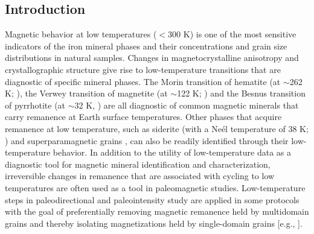\documentclass[draft,gc]{AGUTeX}
\begin{document}
%
%

%

\begin{article}

%
%

\section{Introduction}

Magnetic behavior at low temperatures ($<$300 K) is one of the most sensitive indicators of the iron mineral phases and their  concentrations and grain size distributions in natural samples. Changes in magnetocrystalline anisotropy and crystallographic structure give rise to low-temperature transitions that are diagnostic of specific mineral phases. The Morin transition of hematite (at $\sim$262 K; \cite{Morin1950a}), the Verwey transition of magnetite (at $\sim$122 K; \cite{Verwey1939a}) and the Besnus transition of pyrrhotite (at $\sim$32 K, \cite{Besnus1964a}) are all diagnostic of common magnetic minerals that carry remanence at Earth surface temperatures. Other phases that acquire remanence at low temperature, such as siderite (with a Ne\'el temperature of 38 K; \cite{Frederichs2003a}) and superparamagnetic grains \citep{Worm1999a}, can also be readily identified through their low-temperature behavior. In addition to the utility of low-temperature data as a diagnostic tool for magnetic mineral identification and characterization, irreversible changes in remanence that are associated with cycling to low temperatures are often used as a tool in paleomagnetic studies. Low-temperature steps in paleodirectional and paleointensity study are applied in some protocols with the goal of preferentially removing magnetic remanence held by multidomain grains and thereby isolating magnetizations held by single-domain grains [e.g., \cite{Dunlop2003a, Yamamoto2003a}].


\end{article}
\end{document}
